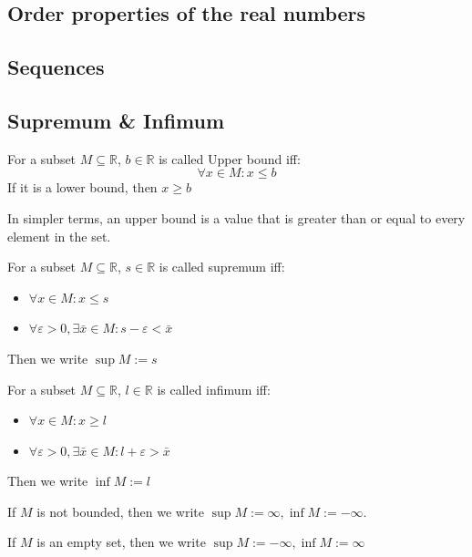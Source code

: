 \documentclass{article}
\newcommand{\R}{\mathbb{R}}
\begin{document}
\clearpage
\subsection{Order properties of the real numbers}
\clearpage

\subsection{Sequences}
\subsection{Supremum \& Infimum}

\begin{definition}
	For a subset $M\subseteq \R$, $b\in \R$ is called Upper bound iff:
	\begin{equation*}
		\forall x\in M: x\leq b
	\end{equation*}
	If it is a lower bound, then $x\geq b$
\end{definition}

In simpler terms, an upper bound is a value that is greater than or equal to every element in the set.

\begin{definition}
	For a subset $M\subseteq \R$, $s\in \R$ is called supremum iff:
	\begin{itemize}
		\item $\forall x\in M: x\leq s$
		\item $\forall \varepsilon >0, \exists \bar{x}\in M : s-\varepsilon< \bar{x}$
	\end{itemize}
	Then we write $\sup M := s$
\end{definition}



\begin{definition}
		For a subset $M\subseteq \R$, $l\in \R$ is called infimum iff:
	\begin{itemize}
		\item $\forall x\in M: x\geq l$
		\item $\forall \varepsilon >0, \exists \bar{x}\in M : l+\varepsilon> \bar{x}$
	\end{itemize}
	Then we write $\inf M := l$
\end{definition}

\begin{remark}
	If $M$ is not bounded, then we write $\sup M:= \infty, \inf M:=-\infty $.
	
	If $M$ is an empty set, then we write $\sup M:= -\infty, \inf M:=\infty$
\end{remark}
\end{document}
